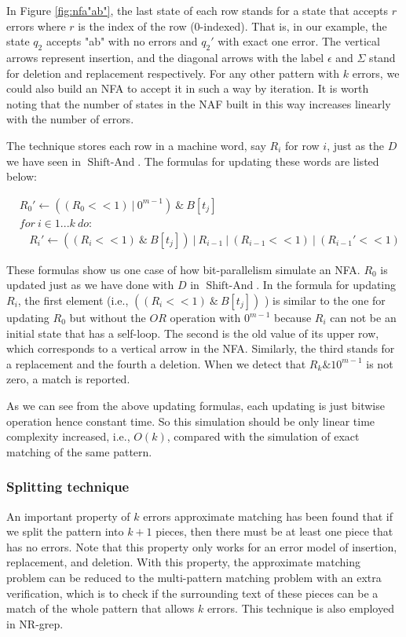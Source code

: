In Figure \ref{fig:nfa"ab"}, the last state of each row stands for a state that accepts $r$ errors where $r$ is the index of the row (0-indexed). That is, in our example, the state $q_2$ accepts "ab" with no errors and $q_2'$  with exact one error. The vertical arrows represent insertion, and the diagonal arrows with the label $\epsilon$ and $\Sigma$ stand for deletion and replacement respectively. For any other pattern with $k$ errors, we could also build an NFA to accept it in such a way by iteration. It is worth noting that the number of states in the NAF built in this way increases linearly with the number of errors.

The technique stores each row in a machine word, say $R_i$ for row $i$, just as the $D$ we have seen in $\operatorname{Shift-And}$.
The formulas for updating these words are listed below:

\begin{align*}
&R_0' \leftarrow  ((R_0 << 1) \ |\ 0^{m-1}) \ \& \ B[t_j] \\
&for \ i \in 1...k \ do:  \\
&\ \ \ \ R_i' \leftarrow ((R_i << 1) \ \& \ B[t_j] ) \ |\ R_{i-1} \ | \ (R_{i-1} << 1 ) \ |\ (R_{i-1}' << 1)
\end{align*}

These formulas show us one case of how bit-parallelism simulate an NFA. $R_0$ is updated just as we have done with $D$ in $\operatorname{Shift-And}$. In the formula for updating $R_i$, the first element (i.e., $((R_i << 1) \ \& \ B[t_j] ) $ ) is similar to the one for updating $R_0$  but without the $OR$ operation with $0^{m-1}$ because $R_i$ can not be an initial state that has a self-loop. The second is the old value of its upper row, which corresponds to a vertical arrow in the NFA. Similarly, the third stands for a replacement and the fourth a deletion. When we detect that $R_k \& 10^{m-1}$ is not zero, a match is reported.  

As we can see from the above updating formulas, each updating is just bitwise operation hence constant time. So this simulation should be only linear time complexity increased, i.e., $O(k)$, compared with the simulation of exact matching of the same pattern.


\subsubsection{Splitting technique}
An important property of $k$ errors approximate matching has been found that if we split the pattern into $k+1$ pieces, then there must be at least one piece that has no errors\cite{wu1992}. Note that this property only works for an error model of insertion, replacement, and deletion. With this property, the approximate matching problem can be reduced to the multi-pattern matching problem with an extra verification, which is to check if the surrounding text of these pieces can be a match of the whole pattern that allows $k$ errors. This technique is also employed in NR-grep. 

